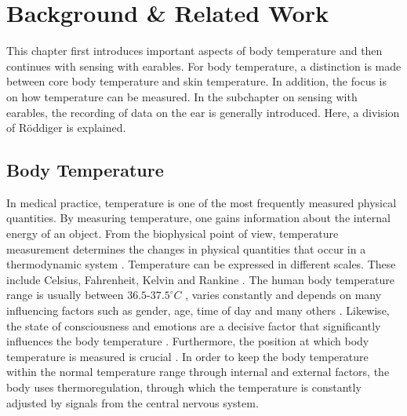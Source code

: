 \chapter{Background \& Related Work}
\label{ch:Background}
This chapter first introduces important aspects of body temperature and then continues with sensing with earables.
For body temperature, a distinction is made between core body temperature and skin temperature. 
In addition, the focus is on how temperature can be measured. 
In the subchapter on sensing with earables, the recording of data on the ear is generally introduced. 
Here, a division of Röddiger \cite{roddigerSensingEarablesSystematic2022a} is explained.

\section{Body Temperature}
\label{Background:BodyTemperature}
In medical practice, temperature is one of the most frequently measured physical quantities.
By measuring temperature, one gains information about the internal energy of an object.
From the biophysical point of view, temperature measurement determines the changes in physical quantities that occur in a thermodynamic system \cite{dolibogComparativeAnalysisHuman2022}.
Temperature can be expressed in different scales.
These include Celsius, Fahrenheit, Kelvin and Rankine \cite{grodzinskyUnderstandingFeverBody2020}.
The human body temperature range is usually between $36.5\text{-}37.5^\circ C$ \cite{hutchisonHypothermiaTherapyTraumatic2008}, varies constantly and depends on many influencing factors such as gender, age, time of day and many others \cite{sund-levanderNormalOralRectal2002}.
Likewise, the state of consciousness and emotions are a decisive factor that significantly influences the body temperature \cite{barbosaescobarTemperatureEmotions2021}.
Furthermore, the position at which body temperature is measured is crucial \cite{Physiologie9783137960072ZVAB}.
In order to keep the body temperature within the normal temperature range through internal and external factors, the body uses thermoregulation, through which the temperature is constantly adjusted by signals from the central nervous system.

